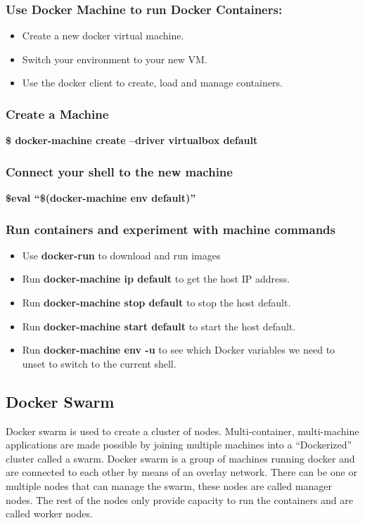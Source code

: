 \documentclass[12pt]{report}
\begin{document}
\subsubsection{Use Docker Machine to run Docker Containers:}
\begin{itemize}
	\item Create a new docker virtual machine.
	\item Switch your environment to your new VM.
	\item Use the docker client to create, load and manage containers.
\end{itemize}
\subsubsection{Create a Machine}
\textbf{\$ docker-machine create --driver virtualbox default}
\subsubsection{Connect your shell to the new machine}
\textbf{\$eval “\$(docker-machine env default)”}
\subsubsection{Run containers and experiment with machine commands}
\begin{itemize}
	\item Use \textbf{docker-run} to download and run images
	\item Run \textbf{docker-machine ip default} to get the host IP address.
	\item Run \textbf{docker-machine stop default} to stop the host default.
	\item Run \textbf{docker-machine start default} to start the host default.
	\item Run \textbf{docker-machine env -u} to see which Docker variables we need to unset to switch to the current shell.
\end{itemize}
\subsection{Docker Swarm}
Docker swarm is used to create a cluster of nodes. Multi-container, multi-machine applications are made possible by joining multiple machines into a “Dockerized” cluster called a swarm. Docker swarm is a group of machines running docker and are connected to each other by means of an overlay network. There can be one or multiple nodes that can manage the swarm, these nodes are called manager nodes. The rest of the nodes only provide capacity to run the containers and are called worker nodes. 
\end{document}
